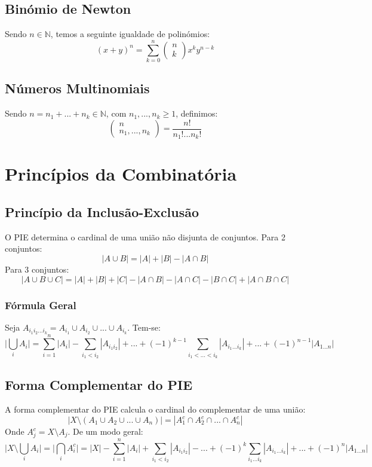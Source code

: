 \documentclass[10pt,a4paper]{report}
\begin{document}
\subsection{Binómio de Newton}
Sendo $n \in \mathbb{N}$, temos a seguinte igualdade de polinómios:
$$
(x+y)^n = \sum_{k=0}^{n} \begin{pmatrix}
n\\
k
\end{pmatrix}
x^ky^{n-k}
$$
\subsection{Números Multinomiais}
Sendo $n = n_1 + ... + n_k \in \mathbb{N}$, com $n_1, ..., n_k \geq 1$, definimos:
$$
\begin{pmatrix}
n\\
n_1, ..., n_k
\end{pmatrix} = \frac{n!}{n_1!...n_k!}
$$
\section{Princípios da Combinatória}
\subsection{Princípio da Inclusão-Exclusão}
O PIE determina o cardinal de uma união não disjunta de conjuntos. Para 2 conjuntos:
$$
|A \cup B| = |A| + |B| - |A \cap B|
$$
Para 3 conjuntos:
$$
|A \cup B \cup C| = |A|+|B|+|C| - |A \cap B| - |A \cap C| - |B \cap C| + |A \cap B \cap C|
$$
\subsubsection{Fórmula Geral}
Seja $A_{i_1i_2...i_k} = A_{i_1} \cup A_{i_2} \cup ... \cup A_{i_k}$. Tem-se:
$$
\Bigg | \bigcup_i A_i \Bigg | = \sum_{i=1}^n |A_i| - \sum_{i_1<i_2} |A_{i_1i_2}| + ... + (-1)^{k-1} \sum_{i_1 < ... < i_k} |A_{i_1...i_k}| + ... + (-1)^{n-1} |A_{1...n}|
$$
\subsection{Forma Complementar do PIE}
A forma complementar do PIE calcula o cardinal do complementar de uma união:
$$
| X \setminus (A_1 \cup A_2 \cup ... \cup A_n) | = |A_1^c \cap A_2^c \cap ... \cap A_n^c |
$$
Onde $A_j^c = X \setminus A_j$. De um modo geral:
$$
\Bigg | X \setminus \bigcup_i A_i \Bigg | = \Bigg | \bigcap_i A_i^c \Bigg | = |X| - \sum_{i = 1}^{n} |A_i| + \sum_{i_1 < i_2} |A_{i_1i_2}| - ... + (-1)^k \sum_{i_1 ... i_k} |A_{i_1 ... i_k}| + ... + (-1)^n |A_{1...n}|
$$
\end{document}
